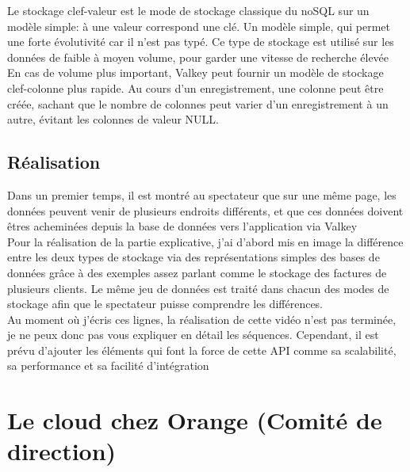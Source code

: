 Le stockage clef-valeur est le mode  de stockage classique du noSQL sur un modèle simple: à une valeur correspond une clé. Un modèle simple, qui permet une forte évolutivité car il n'est pas typé. Ce type de stockage est utilisé sur les données de faible à moyen volume, pour garder une vitesse de recherche élevée\\

En cas de volume plus important, Valkey peut fournir un modèle de stockage clef-colonne plus rapide. Au cours d’un enregistrement, une colonne peut être créée, sachant que le nombre de colonnes peut varier d’un enregistrement à un autre, évitant les colonnes de valeur NULL.\\


\subsection{Réalisation}

Dans un premier temps, il est montré au spectateur que sur une même page, les données peuvent venir de plusieurs endroits différents, et que ces données doivent êtres acheminées depuis la base de données vers l'application via Valkey\\

Pour la réalisation de la partie explicative, j'ai d'abord mis en image la différence entre les deux types de stockage via des représentations simples des bases de données grâce à des exemples assez parlant comme le stockage des factures de plusieurs clients. Le même jeu de données est traité dans chacun des modes de stockage afin que le spectateur puisse comprendre les différences.\\

Au moment où j'écris ces lignes, la réalisation de cette vidéo n'est pas terminée, je ne peux donc pas vous expliquer en détail les séquences. Cependant, il est prévu d'ajouter les éléments qui font la force de cette API comme sa scalabilité, sa performance et sa facilité d'intégration 



\section{Le cloud chez Orange (Comité de direction)}
